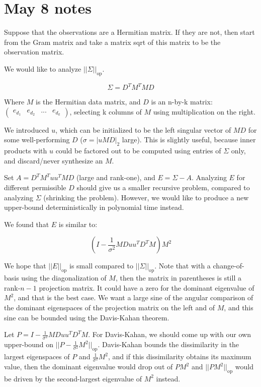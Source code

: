 \documentclass{article}
\begin{document}
\section{May 8 notes}

Suppose that the observations are a Hermitian matrix. If they are not, then start from the Gram matrix and take a matrix sqrt of this matrix to be the observation matrix.

We would like to analyze $||\Sigma||_\text{op}$.

$$\Sigma = D^T M^T M D$$

Where $M$ is the Hermitian data matrix, and $D$ is an n-by-k matrix:\\ $\left(\begin{matrix} e_{d_1} & e_{d_2} & ... & e_{d_k} \end{matrix}\right)$, selecting k columns of $M$ using multiplication on the right.

We introduced $u$, which can be initialized to be the left singular vector of $MD$ for some well-performing $D$ ($\sigma = |uMD|_2$ large). This is slightly useful, because inner products with $u$ could be factored out to be computed using entries of $\Sigma$ only, and discard/never synthesize an $M$.

Set $A = D^T M^T u u^T M D$ (large and rank-one), and $E = \Sigma - A$. Analyzing $E$ for different permissible $D$ should give us a smaller recursive problem, compared to analyzing $\Sigma$ (shrinking the problem). However, we would like to produce a new upper-bound deterministically in polynomial time instead.

We found that $E$ is similar to:

$$(I - \frac{1}{\sigma^2} M D u u^T D^T M) M^2$$

We hope that $||E||_\text{op}$ is small compared to $||\Sigma||_\text{op}$. Note that with a change-of-basis using the diagonalization of $M$, then the matrix in parentheses is still a rank-$n-1$ projection matrix. It could have a zero for the dominant eigenvalue of $M^2$, and that is the best case. We want a large sine of the angular comparison of the dominant eigenspaces of the projection matrix on the left and of $M$, and this sine can be bounded using the Davis-Kahan theorem.

Let $P = I - \frac{1}{\sigma^2} MDu u^T D^T M$. For Davis-Kahan, we should come up with our own upper-bound on $||P - \frac{1}{\sigma^2} M^2||_\text{op}$. Davis-Kahan bounds the dissimilarity in the largest eigenspaces of $P$ and $\frac{1}{\sigma^2} M^2$, and if this dissimilarity obtains its maximum value, then the dominant eigenvalue would drop out of $PM^2$ and $||PM^2||_\text{op}$ would be driven by the second-largest eigenvalue of $M^2$ instead.
\end{document}
